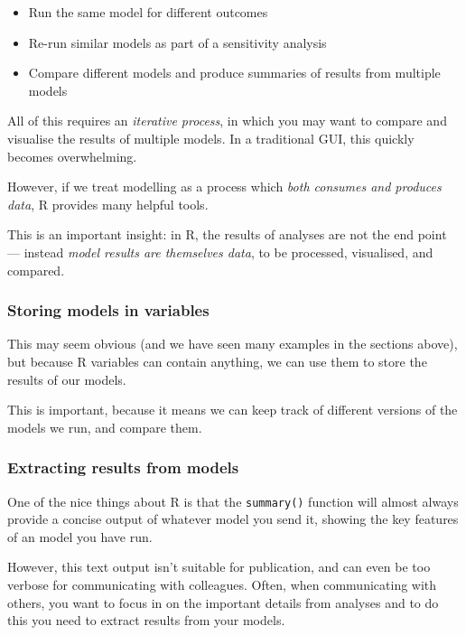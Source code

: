 \documentclass[]{article}
\providecommand{\tightlist}{%
  \setlength{\itemsep}{0pt}\setlength{\parskip}{0pt}}
\theoremstyle{definition}
\theoremstyle{definition}
\theoremstyle{definition}
\theoremstyle{remark}
\begin{document}
\begin{itemize}
\tightlist
\item
  Run the same model for different outcomes
\item
  Re-run similar models as part of a sensitivity analysis
\item
  Compare different models and produce summaries of results from
  multiple models
\end{itemize}

All of this requires an \emph{iterative process}, in which you may want
to compare and visualise the results of multiple models. In a
traditional GUI, this quickly becomes overwhelming.

However, if we treat modelling as a process which \emph{both consumes
and produces data}, R provides many helpful tools.

This is an important insight: in R, the results of analyses are not the
end point --- instead \emph{model results are themselves data}, to be
processed, visualised, and compared.

\subsubsection*{Storing models in
variables}\label{storing-models-in-variables}

This may seem obvious (and we have seen many examples in the sections
above), but because R variables can contain anything, we can use them to
store the results of our models.

This is important, because it means we can keep track of different
versions of the models we run, and compare them.

\subsubsection*{Extracting results from
models}\label{extract-results-from-models}

One of the nice things about R is that the \texttt{summary()} function
will almost always provide a concise output of whatever model you send
it, showing the key features of an model you have run.

However, this text output isn't suitable for publication, and can even
be too verbose for communicating with colleagues. Often, when
communicating with others, you want to focus in on the important details
from analyses and to do this you need to extract results from your
models.
\end{document}
